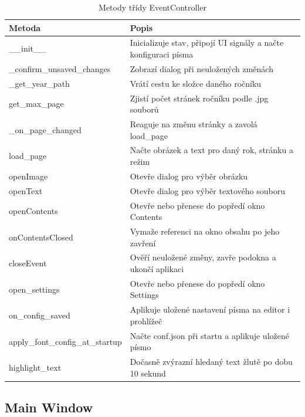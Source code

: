 \documentclass[FM,Proj]{tulthesis}
\begin{document}
\begin{table}[H]
	\centering
	\caption{Metody třídy EventController}
	\begin{tabularx}{\textwidth}{|l|X|}
		\hline
		\textbf{Metoda} & \textbf{Popis} \\ \hline
		\_\_init\_\_                     & Inicializuje stav, připojí UI signály a načte konfiguraci písma \\ \hline
		\_confirm\_unsaved\_changes       & Zobrazí dialog při neuložených změnách \\ \hline
		\_get\_year\_path                & Vrátí cestu ke složce daného ročníku \\ \hline
		get\_max\_page                   & Zjistí počet stránek ročníku podle .jpg souborů \\ \hline
		\_on\_page\_changed              & Reaguje na změnu stránky a zavolá load\_page \\ \hline
		load\_page                       & Načte obrázek a text pro daný rok, stránku a režim \\ \hline
		openImage                        & Otevře dialog pro výběr obrázku \\ \hline
		openText                         & Otevře dialog pro výběr textového souboru \\ \hline
		openContents                     & Otevře nebo přenese do popředí okno Contents \\ \hline
		onContentsClosed                 & Vymaže referenci na okno obsahu po jeho zavření \\ \hline
		closeEvent                       & Ověří neuložené změny, zavře podokna a ukončí aplikaci \\ \hline
		open\_settings                   & Otevře nebo přenese do popředí okno Settings \\ \hline
		on\_config\_saved               & Aplikuje uložené nastavení písma na editor i prohlížeč \\ \hline
		apply\_font\_config\_at\_startup & Načte conf.json při startu a aplikuje uložené písmo \\ \hline
		highlight\_text                  & Dočasně zvýrazní hledaný text žlutě po dobu 10 sekund \\ \hline
	\end{tabularx}
	\label{tab:eventcontroller}
\end{table}

\clearpage

\subsection{Main Window}
\end{document}
